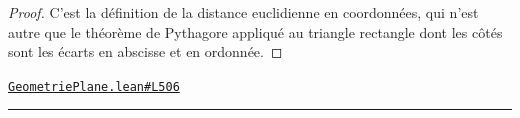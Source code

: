 \documentclass[11pt,a4paper]{article}
\theoremstyle{definition}
\theoremstyle{plain}
\newcommand{\source}[2]{\par\smallskip\noindent\hfill{\footnotesize\href{#1}{\texttt{#2}}}\par\smallskip}
\begin{document}
\begin{proof}
C'est la définition de la distance euclidienne en coordonnées, qui n'est autre que le
théorème de Pythagore appliqué au triangle rectangle dont les côtés sont les écarts en
abscisse et en ordonnée.
\end{proof}
\source{https://github.com/Commutator-IO/learn-lean/blob/main/courses/01-college/02-geometrie-plane/GeometriePlane.lean\#L506}{GeometriePlane.lean\#L506}

\vfill
\noindent\rule{0.35\linewidth}{0.4pt}\par
{}
\end{document}
